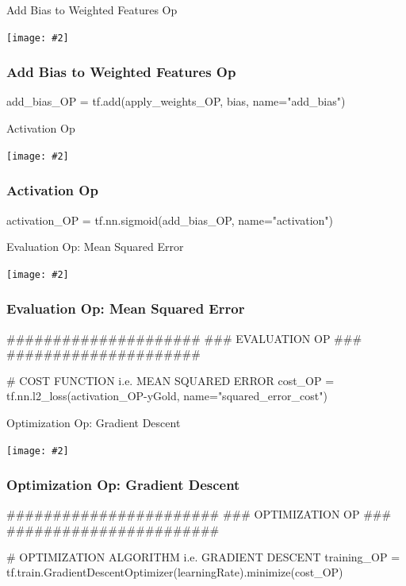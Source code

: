 \documentclass[14pt]{beamer}
\newcommand {\framedgraphic}[2] { %
    \begin{frame}{#1}
        \begin{center}
            \texttt{[image: \#2]}
        \end{center}
    \end{frame}
}
\begin{document}
\framedgraphic{Add Bias to Weighted Features Op}{3-add-bias.png}

\begin{frame}[fragile]
  \frametitle{Add Bias to Weighted Features Op}
  \begin{python}
add_bias_OP = tf.add(apply_weights_OP, bias, name="add_bias") 
  \end{python}
\end{frame}


\framedgraphic{Activation Op}{4-apply-sigmoid.png}

\begin{frame}[fragile]
  \frametitle{Activation Op}
  \begin{python}
activation_OP = tf.nn.sigmoid(add_bias_OP, name="activation")
  \end{python}
\end{frame}


\framedgraphic{Evaluation Op: Mean Squared Error}{5-loss-function.png}

\begin{frame}[fragile]
  \frametitle{Evaluation Op: Mean Squared Error}
  \begin{python}
#####################
### EVALUATION OP ###
#####################

# COST FUNCTION i.e. MEAN SQUARED ERROR
cost_OP = tf.nn.l2_loss(activation_OP-yGold, name="squared_error_cost")  \end{python}
\end{frame}

\framedgraphic{Optimization Op: Gradient Descent}{6-optimization.png}

\begin{frame}[fragile]
  \frametitle{Optimization Op: Gradient Descent}
  \begin{python}
#######################
### OPTIMIZATION OP ###
#######################

# OPTIMIZATION ALGORITHM i.e. GRADIENT DESCENT
training_OP = tf.train.GradientDescentOptimizer(learningRate).minimize(cost_OP)
  \end{python}
\end{frame}
\end{document}
